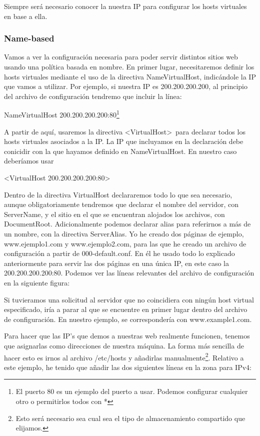 \documentclass[a4paper, 10pt]{article} %
\begin{document}
Siempre será necesario conocer la nuestra IP para configurar los hosts virtuales en base a ella. 

\subsubsection{Name-based}

Vamos a ver la configuración necesaria para poder servir distintos sitios web usando una política basada en nombre. En primer lugar, necesitaremos definir los hosts virtuales mediante el uso de la directiva NameVirtualHost, indicándole la IP que vamos a utilizar. Por ejemplo, si nuestra IP es 200.200.200.200, al principio del archivo de configuración tendremo que incluir la línea:

NameVirtualHost 200.200.200.200:80\footnote{El puerto 80 es un ejemplo del puerto a usar. Podemos configurar cualquier otro o permitirlos todos con *}

A partir de aquí, usaremos la directiva <VirtualHost>\ para declarar todos los hosts virtuales asociados a la IP. La IP que incluyamos en la declaración debe conicidir con la que hayamos definido en NameVirtualHost. En nuestro caso deberíamos usar 

<VirtualHost 200.200.200.200:80>

Dentro de la directiva VirtualHost declararemos todo lo que sea necesario, aunque obligatoriamente tendremos que declarar el nombre del servidor, con ServerName, y el sitio en el que se encuentran alojados los archivos, con DocumentRoot. Adicionalmente podemos declarar alias para referirnos a más de un nombre, con la directiva ServerAlias. Yo he creado dos páginas de ejemplo, www.ejemplo1.com y www.ejemplo2.com, para las que he creado un archivo de configuración a partir de 000-default.conf. En él he usado todo lo explicado anteriormente para servir las dos páginas en una única IP, en este caso la 200.200.200.200:80. Podemos ver las líneas relevantes del archivo de configuración en la siguiente figura: 


Si tuvieramos una solicitud al servidor que no coincidiera con ningún host virtual especificado, iría a parar al que se encuentre en primer lugar dentro del archivo de configuración. En nuestro ejemplo, se correspondería con www.example1.com. 

Para hacer que las IP's que demos a nuestras web realmente funcionen, tenemos que asignarlas como direcciones de nuestra máquina. La forma más sencilla de hacer esto es irnos al archivo /etc/hosts y añadirlas manualmente\footnote{Esto será necesario sea cual sea el tipo de almacenamiento compartido que elijamos.}. Relativo a este ejemplo, he tenido que añadir las dos siguientes líneas en la zona para IPv4: 
\end{document}
